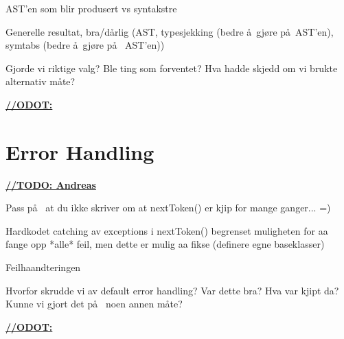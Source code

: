 AST'en som blir produsert vs syntakstre

Generelle resultat, bra/d\aa rlig (AST, typesjekking (bedre \aa~gj\o re p\aa~AST'en),
symtabs (bedre \aa~gj\o re p\aa~ AST'en))

Gjorde vi riktige valg? Ble ting som forventet? Hva hadde skjedd om vi brukte alternativ m\aa te? 

\underline{\textbf{\LARGE //ODOT:}}

\section{Error Handling}
\underline{\textbf{\LARGE //TODO: Andreas}}

Pass p\aa~ at du ikke skriver om at nextToken() er kjip for mange ganger... =)

Hardkodet catching av exceptions i nextToken() begrenset muligheten for aa
fange opp *alle* feil, men dette er mulig aa fikse (definere egne baseklasser)

Feilhaandteringen

Hvorfor skrudde vi av default error handling? Var dette bra? Hva var kjipt da? Kunne vi gjort det p\aa~ noen annen m\aa te?

\underline{\textbf{\LARGE //ODOT:}}




